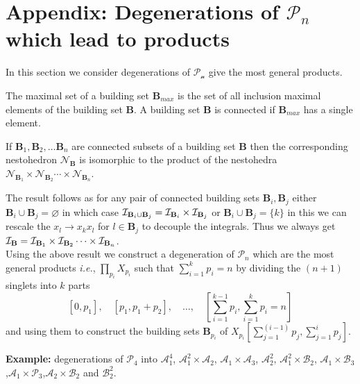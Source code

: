 \documentclass[hidelinks,12pt]{article}
\begin{document}
\appendix 

\section{Appendix: Degenerations of ${\mathscr P_n}$ which lead to products}\label{appendix:A}
In this section we consider degenerations of $\mathscr{P_n}$ give the most general products. 

The maximal set of a building set ${\mathbf B_{max}}$ is the set of all inclusion maximal elements of the building set ${\mathbf B}$. A building set ${\mathbf B}$ is connected if ${\mathbf B_{max}}$ has a single element\cite{Postnikov:2006}.

\vspace{1ex}

 If ${\mathbf B_1},{\mathbf B_2},\dots {\mathbf B_n}$ are connected subsets of a building set ${\mathbf B}$ then the corresponding nestohedron ${\mathscr N_{{\mathbf B}}}$ is isomorphic to the product of the nestohedra ${\mathscr N}_{ {\mathbf B_1}} \times{\mathscr N}_{ {\mathbf B_2}} \cdots \times {\mathscr N}_{{\mathbf B_n}}$\cite{Postnikov:2006}.

\vspace{1ex}

The result follows as for any pair of connected building sets ${\mathbf B_{i}},{\mathbf B_{j}}$ either  ${\mathbf B_{i}} \cup {\mathbf B_{j}} = \varnothing $ in which case ${\cal I}_{{\mathbf B_i}\cup {\mathbf B_j}} = {\cal I}_{\mathbf B_i} \times {\cal I}_{\mathbf B_j}$ or ${\mathbf B_{i}} \cup {\mathbf B_{j}} = \{k\}$ in this we can rescale the $x_l \rightarrow x_k x_l$ for $l \in {\mathbf B_{j}} $ to decouple the integrals. Thus we always get ${\cal I}_{\mathbf B}={\cal I}_{\mathbf B_1}\times{\cal I}_{\mathbf B_2}\cdots \times{\cal I}_{\mathbf B_n}$. \\
Using the above result we construct a degeneration of  ${\mathscr P_n}$ which are the most general products {\it i.e.}, $\prod_{p_i} X_{p_i}$ such that $\sum^{k}_{i=1} p_{i} = n$ by dividing the $(n+1)$ singlets into $k$ parts 
\[
[0,p_1],\quad [p_1,p_1+p_2],\quad \dots ,\quad [\sum^{k-1}_{i=1}p_{i},\sum^{k}_{i=1}p_{i}= n]
\]
and using them to construct the building sets $\mathbf B_{p_i}$ of $X_{p_i}\left[\sum^{(i-1)}_{j=1}p_{j},\sum^{i}_{j=1}p_{j}\right].$ 

{\bf Example:} degenerations of ${\mathscr P_4}$ into ${\mathscr A_1^{4}}$, ${\mathscr A_1^2} \times{\mathscr A_2}$, ${\mathscr A_1} \times {\mathscr A_3}$, ${\mathscr A^{2}_2}$, ${\mathscr A_1^2} \times {\mathscr B_2}$, ${\mathscr A_1} \times {\mathscr B_3}$,${\mathscr A_1} \times {\mathscr P_3}$,$ {\mathscr A_2}\times {\mathscr B_2}$ and ${\mathscr B^{2}_2}$.
 
\end{document}
